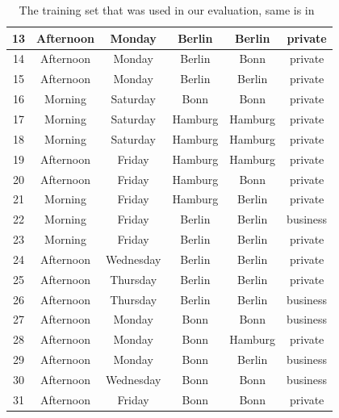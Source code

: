 \documentclass[a4paper,12pt]{article}
\begin{document}
\begin{spacing}{1.5}
\begin{table}[h]
\begin{tabular}{|c|c|c|c|c|c|}
13         & Afternoon           & Monday              & Berlin           & Berlin        & private       \\\hline
14         & Afternoon           & Monday              & Berlin           & Bonn          & private       \\\hline
15         & Afternoon           & Monday              & Berlin           & Berlin        & private       \\\hline
16         & Morning             & Saturday            & Bonn             & Bonn          & private       \\\hline
17         & Morning             & Saturday            & Hamburg          & Hamburg       & private       \\\hline
18         & Morning             & Saturday            & Hamburg          & Hamburg       & private       \\\hline
19         & Afternoon           & Friday              & Hamburg          & Hamburg       & private       \\\hline
20         & Afternoon           & Friday              & Hamburg          & Bonn          & private       \\\hline
21         & Morning             & Friday              & Hamburg          & Berlin        & private       \\\hline
22         & Morning             & Friday              & Berlin           & Berlin        & business      \\\hline
23         & Morning             & Friday              & Berlin           & Berlin        & private       \\\hline
24         & Afternoon           & Wednesday           & Berlin           & Berlin        & private       \\\hline
25         & Afternoon           & Thursday            & Berlin           & Berlin        & private       \\\hline
26         & Afternoon           & Thursday            & Berlin           & Berlin        & business      \\\hline
27         & Afternoon           & Monday              & Bonn             & Bonn          & business      \\\hline
28         & Afternoon           & Monday              & Bonn             & Hamburg       & private       \\\hline
29         & Afternoon           & Monday              & Bonn             & Berlin        & business      \\\hline
30         & Afternoon           & Wednesday           & Bonn             & Bonn          & business      \\\hline
31         & Afternoon           & Friday              & Bonn             & Bonn          & private       \\\hline
\end{tabular}
\caption{The training set that was used in our evaluation, same is in~\cite{dror2011thesis}}
\label{ref:datatable}
\end{table}



\end{spacing}
\end{document}
